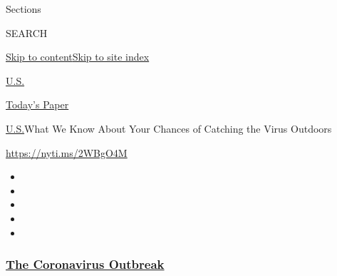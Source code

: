 Sections

SEARCH

\protect\hyperlink{site-content}{Skip to
content}\protect\hyperlink{site-index}{Skip to site index}

\href{https://www.nytimes3xbfgragh.onion/section/us}{U.S.}

\href{https://myaccount.nytimes3xbfgragh.onion/auth/login?response_type=cookie\&client_id=vi}{}

\href{https://www.nytimes3xbfgragh.onion/section/todayspaper}{Today's
Paper}

\href{/section/us}{U.S.}\textbar{}What We Know About Your Chances of
Catching the Virus Outdoors

\url{https://nyti.ms/2WBgO4M}

\begin{itemize}
\item
\item
\item
\item
\item
\end{itemize}

\hypertarget{the-coronavirus-outbreak}{%
\subsubsection{\texorpdfstring{\href{https://www.nytimes3xbfgragh.onion/news-event/coronavirus?name=styln-coronavirus-national\&region=TOP_BANNER\&block=storyline_menu_recirc\&action=click\&pgtype=Article\&impression_id=1a3fae50-f1bf-11ea-ac7c-bfa2516a0867\&variant=undefined}{The
Coronavirus
Outbreak}}{The Coronavirus Outbreak}}\label{the-coronavirus-outbreak}}

